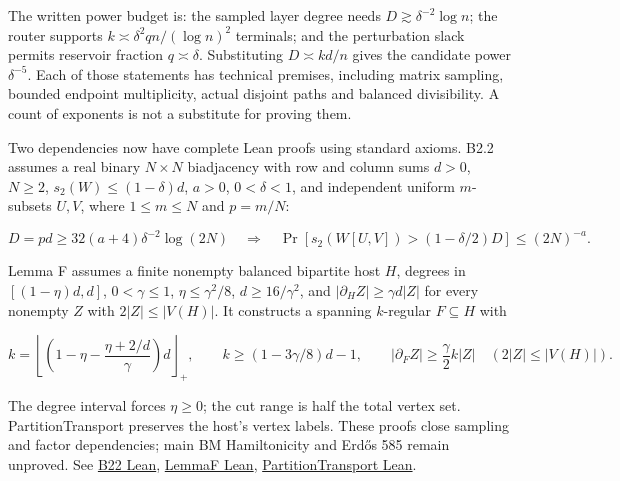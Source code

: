 \documentclass[
  11pt,
]{article}
\newcounter{none} %
\begin{document}
The written power budget is: the sampled layer degree needs
\(D\gtrsim\delta^{-2}\log n\); the router supports
\(k\asymp\delta^2 qn/(\log n)^2\) terminals; and the perturbation slack
permits reservoir fraction \(q\asymp\delta\). Substituting
\(D\asymp kd/n\) gives the candidate power \(\delta^{-5}\). Each of
those statements has technical premises, including matrix sampling,
bounded endpoint multiplicity, actual disjoint paths and balanced
divisibility. A count of exponents is not a substitute for proving them.

Two dependencies now have complete Lean proofs using standard axioms.
B2.2 assumes a real binary \(N\times N\) biadjacency with row and column
sums \(d>0\), \(N\ge2\), \(s_2(W)\le(1-\delta)d\), \(a>0\),
\(0<\delta<1\), and independent uniform \(m\)-subsets \(U,V\), where
\(1\le m\le N\) and \(p=m/N\):

\[
D=pd\ge32(a+4)\delta^{-2}\log(2N)
\quad\Longrightarrow\quad
\Pr\!\left[s_2(W[U,V])>(1-\delta/2)D\right]\le(2N)^{-a}.
\]

Lemma F assumes a finite nonempty balanced bipartite host \(H\), degrees
in \([(1-\eta)d,d]\), \(0<\gamma\le1\), \(\eta\le\gamma^2/8\),
\(d\ge16/\gamma^2\), and \(|\partial_H Z|\ge\gamma d|Z|\) for every
nonempty \(Z\) with \(2|Z|\le|V(H)|\). It constructs a spanning
\(k\)-regular \(F\subseteq H\) with

\[
k=\left\lfloor\left(1-\eta-\frac{\eta+2/d}{\gamma}\right)d\right\rfloor_{+},
\qquad k\ge(1-3\gamma/8)d-1,
\qquad |\partial_F Z|\ge\frac\gamma2 k|Z|
\quad(2|Z|\le|V(H)|).
\]

The degree interval forces \(\eta\ge0\); the cut range is half the total
vertex set. PartitionTransport preserves the host's vertex labels. These
proofs close sampling and factor dependencies; main BM Hamiltonicity and
Erdős 585 remain unproved. See
\href{https://github.com/alejandrozu/openmath-2026-judging/blob/70c5ec3107658182f22c207d4c50f53f9cb3e602/robert-review-2026-10-07/lean/B22.lean\#L26}{B22
Lean},
\href{https://github.com/alejandrozu/openmath-2026-judging/blob/70c5ec3107658182f22c207d4c50f53f9cb3e602/robert-review-2026-10-07/lean/LemmaF.lean\#L18}{LemmaF
Lean},
\href{https://github.com/alejandrozu/openmath-2026-judging/blob/70c5ec3107658182f22c207d4c50f53f9cb3e602/robert-review-2026-10-07/lean/PartitionTransport.lean\#L54}{PartitionTransport
Lean}.
\end{document}
